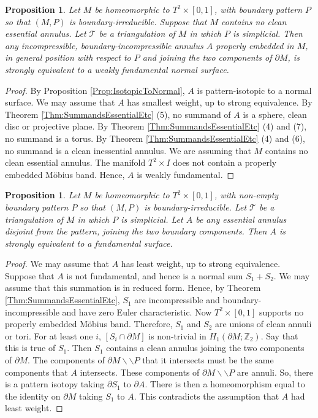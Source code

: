 \documentclass[oneside]{amsart}
\numberwithin{equation}{section}
\theoremstyle{plain}
\newtheorem{proposition}[equation]{Proposition}
\theoremstyle{definition}
\newcommand{\cut}{\backslash\backslash}
\begin{document}
\begin{proposition}
\label{Prop:MakeWeaklyFundamentalTorusTimesI}
Let $M$ be homeomorphic to $T^2 \times [0,1]$, with boundary pattern $P$ so that 
$(M,P)$ is boundary-irreducible. Suppose that $M$ contains no clean essential annulus.
Let $\mathcal{T}$ be a triangulation of $M$ in which $P$ is simplicial. 
Then any incompressible, boundary-incompressible annulus $A$ properly embedded in $M$, in general position with respect to $P$ and joining the
two components of $\partial M$, is strongly equivalent to a weakly fundamental normal surface.
\end{proposition}

\begin{proof}
By Proposition \ref{Prop:IsotopicToNormal}, $A$ is pattern-isotopic to a normal surface. 
We may assume that $A$ has smallest weight, up to strong equivalence.
By Theorem \ref{Thm:SummandsEssentialEtc} (5), no summand of $A$ is a sphere,
clean disc or projective plane. By Theorem \ref{Thm:SummandsEssentialEtc} (4) and (7), 
no summand is a torus. By Theorem \ref{Thm:SummandsEssentialEtc} (4) and (6), no summand
is a clean inessential annulus. We are assuming that $M$ contains no clean essential annulus.
The manifold $T^2 \times I$ does not contain a properly embedded M\"obius band. Hence,
$A$ is weakly fundamental.
\end{proof}



\begin{proposition}
\label{Prop:TorusTimesI}
Let $M$ be homeomorphic to $T^2 \times [0,1]$, with non-empty boundary pattern $P$ so that 
$(M,P)$ is boundary-irreducible. Let $\mathcal{T}$ be a triangulation of $M$ in which $P$ is simplicial.
Let $A$ be any essential annulus disjoint from the pattern, joining the two boundary components.
Then $A$ is strongly equivalent to a fundamental surface.
\end{proposition}

\begin{proof}
We may assume that $A$ has least weight, up to strong equivalence.
Suppose that $A$ is not fundamental, and hence is a normal sum
$S_1 + S_2$. We may assume that this summation is in reduced form. Hence, by Theorem \ref{Thm:SummandsEssentialEtc},
$S_1$ are incompressible and boundary-incompressible and have zero Euler characteristic.
Now $T^2 \times [0,1]$ supports no properly embedded M\"obius band. Therefore,
$S_1$ and $S_2$ are unions of clean annuli or tori. 
For at least one $i$,
$[S_i \cap \partial M]$ is non-trivial in $H_1(\partial M; \mathbb{Z}_2)$. Say that this is true 
of $S_1$. Then $S_1$ contains a clean annulus joining the two components of $\partial M$. The components
of $\partial M \cut P$ that it intersects must be the same components that $A$ intersects. These components
of $\partial M \cut P$ are annuli.
So, there is a pattern isotopy taking $\partial S_1$ to $\partial A$. There is then a homeomorphism
equal to the identity on $\partial M$ taking $S_1$ to $A$. This contradicts the assumption
that $A$ had least weight.
\end{proof}
\end{document}
